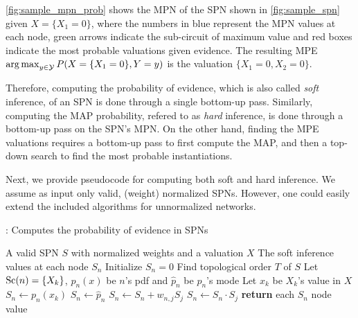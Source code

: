 \autoref{fig:sample_mpn_prob} shows the MPN of the SPN shown in \autoref{fig:sample_spn} given
$X=\{X_1=0\}$, where the numbers in blue represent the MPN values at each node, green arrows
indicate the sub-circuit of maximum value and red boxes indicate the most probable valuations given
evidence. The resulting MPE $\operatorname*{arg\,max}_{y\in\mathcal{Y}} P(X=\{X_1=0\},Y=y)$ is the valuation
$\{X_1=0, X_2=0\}$.

Therefore, computing the probability of evidence, which is also called \textit{soft} inference, of
an SPN is done through a single bottom-up pass. Similarly, computing the MAP probability, refered
to as \textit{hard} inference, is done through a bottom-up pass on the SPN's MPN\@.  On the other
hand, finding the MPE valuations requires a bottom-up pass to first compute the MAP, and then a
top-down search to find the most probable instantiations.

Next, we provide pseudocode for computing both soft and hard inference. We assume as input only
valid, (weight) normalized SPNs. However, one could easily extend the included algorithms for
unnormalized networks.
\begin{algorithm}[h]
  \caption{: Computes the probability of evidence in SPNs}
  \begin{algorithmic}[1]
    \Require A valid SPN $S$ with normalized weights and a valuation $X$
    \Ensure The soft inference values at each node $S_n$
    \State Initialize $S_n=0$
    \State Find topological order $T$ of $S$
        \State Let $\operatorname*{\text{Sc}}(n)=\{X_k\}$, $p_n(x)$ be $n$'s pdf and $\hat{p}_n$ be $p_n$'s mode
          \State Let $x_k$ be $X_k$'s value in $X$
          \State $S_n\gets p_n(x_k)$
        \Else%
          \State $S_n\gets\hat{p}_n$
        \EndIf%
          \State $S_n\gets S_n + w_{n,j}S_j$
        \EndFor%
      \Else%
          \State $S_n\gets S_n\cdot S_j$
        \EndFor%
      \EndIf
    \EndFor%
    \State \textbf{return} each $S_n$ node value
  \end{algorithmic}
\end{algorithm}

